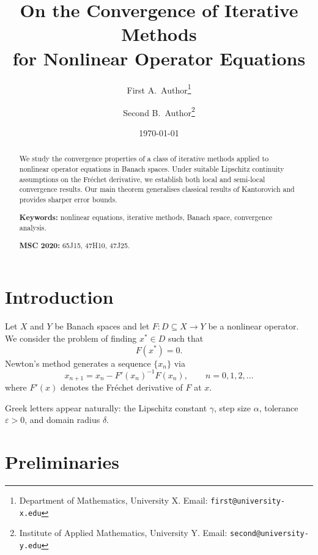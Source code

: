 \documentclass[12pt, a4paper]{article}
\title{On the Convergence of Iterative Methods\\
       for Nonlinear Operator Equations}
\author{%
    First A.\ Author\thanks{Department of Mathematics, University X.
    Email: \texttt{first@university-x.edu}}
    \and
    Second B.\ Author\thanks{Institute of Applied Mathematics, University Y.
    Email: \texttt{second@university-y.edu}}
}
\date{\today}
\theoremstyle{plain}       %
\theoremstyle{definition}  %
\theoremstyle{remark}      %
\begin{document}
\maketitle

\begin{abstract}
    We study the convergence properties of a class of iterative methods
    applied to nonlinear operator equations in Banach spaces.  Under suitable
    Lipschitz continuity assumptions on the Fr\'{e}chet derivative, we
    establish both local and semi-local convergence results.  Our main theorem
    generalises classical results of Kantorovich and provides sharper error
    bounds.

    \medskip
    \noindent\textbf{Keywords:} nonlinear equations, iterative methods,
    Banach space, convergence analysis.

    \noindent\textbf{MSC 2020:} 65J15, 47H10, 47J25.
\end{abstract}

\section{Introduction}
\label{sec:intro}

Let $X$ and $Y$ be Banach spaces and let $F \colon D \subseteq X \to Y$ be a
nonlinear operator.  We consider the problem of finding $x^{*} \in D$ such
that
%
\begin{equation}
    F(x^{*}) = 0.
    \label{eq:main_problem}
\end{equation}
%
Newton's method generates a sequence $\{x_n\}$ via
%
\begin{equation}
    x_{n+1} = x_n - F'(x_n)^{-1} F(x_n), \qquad n = 0, 1, 2, \dots
    \label{eq:newton}
\end{equation}
%
where $F'(x)$ denotes the Fr\'{e}chet derivative of $F$ at $x$.

Greek letters appear naturally: the Lipschitz constant $\gamma$, step size
$\alpha$, tolerance $\varepsilon > 0$, and domain radius $\delta$.

\section{Preliminaries}
\label{sec:prelim}
\end{document}
